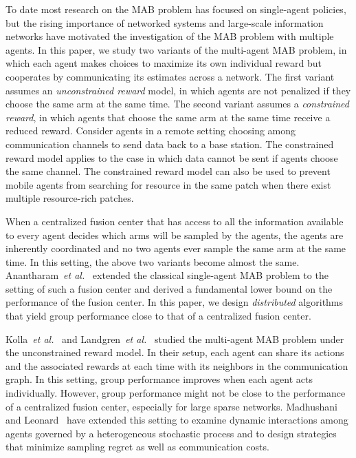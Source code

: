 \documentclass[final,5p,times,twocolumn]{elsarticle}
\def \etal {\emph{et al.}}
\theoremstyle{definition}
\begin{document}
To date most research on the MAB problem has focused on single-agent policies, but the rising importance of networked systems and large-scale information networks have motivated the investigation of the MAB problem with multiple agents. %
In this paper, we study two variants of the multi-agent MAB problem, in which each agent makes choices to maximize its own individual reward but cooperates by communicating its estimates across a network. 
The first variant assumes an {\em unconstrained reward} model, in which agents are not penalized if they choose the same arm at the same time.  %
The second variant assumes a \emph{constrained reward}, in which agents that choose the same arm at the same time receive a reduced reward.  Consider agents in a remote setting choosing among communication channels to send data back to a base station.  The constrained reward model applies to the case in which data cannot be sent if agents choose the same channel.  The constrained reward model can also be used to prevent mobile agents from searching for resource in the same patch when there exist multiple resource-rich patches.



When a centralized fusion center that has access to all the information available to every agent decides which arms will be sampled by the agents, the agents are inherently coordinated and no two agents ever sample the same arm at the same time. In this setting, the above two variants become almost the same. Anantharam~\etal~\cite{VA-PV-JW:87} extended the classical single-agent MAB problem to the setting of such a fusion center and derived a fundamental lower bound on the performance of the fusion center. In this paper, we design {\em distributed} algorithms that yield group performance close to that of a centralized fusion center. 

Kolla~\etal~\cite{KollaJG16} and Landgren~\etal~\cite{PL-VS-NEL:18c} studied the multi-agent MAB problem under the unconstrained reward model. In their setup, each agent can share its actions and the associated rewards at each time with its neighbors in the communication graph. In this setting, group performance improves when each agent acts individually.  However, group performance might not be close to the performance of a centralized fusion center, especially for large sparse networks. Madhushani and Leonard~\cite{madhushani2019heterogeneous,madhushani2020observation} have extended this setting to examine dynamic interactions among agents  governed by a heterogeneous stochastic process and to design strategies that minimize sampling regret as well as communication costs.
\end{document}
